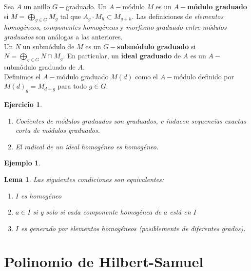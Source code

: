 \documentclass[12pt]{book}
\newtheorem{eje}{Ejemplo}
\newtheorem{lem}{Lema}
\newtheorem{ex}{Ejercicio}
\begin{document}
Sea $A$ un anillo $G-$graduado. Un $A-$módulo $M$ es un \textbf{$A-$módulo graduado} si $M=\bigoplus _{g\in G} M_g$ tal que $A_g \cdot M_{h} \subset M_{g+h}$. Las definiciones de \textit{elementos homogéneos}, \textit{componentes homogéneas} y \textit{morfismo graduado entre módulos graduados} son análogas a las anteriores.\\
Un $N$ un submódulo de $M$ es un \textbf{$G-$submódulo graduado} si $N=\bigoplus_{g\in G} N \cap M_g$. En particular, un \textbf{ideal graduado} de $A$ es un $A-$submódulo graduado de $A$.\\
Definimos el $A-$módulo graduado $M(d)$ como el $A-$módulo definido por $M(d)_g= M_{d+g}$ para todo $g\in G$.

\begin{ex}
	\begin{enumerate}
		\item Cocientes de módulos graduados son graduados, e inducen sequencias exactas corta de módulos graduados.
		\item El radical de un ideal homogéneo es homogéneo.
	\end{enumerate}
\end{ex}


\begin{eje}
\end{eje}

\begin{lem}
	Las siguientes condiciones son equivalentes:
	\begin{enumerate}
		\item $I$ es homogéneo
		\item $a\in I$ si y solo si cada componente homogénea de $a$ está en $I$
		\item $I$ es generado por elementos homogéneos (posiblemente de diferentes grados).
	\end{enumerate}
\end{lem}




\section{Polinomio de Hilbert-Samuel}
\end{document}
